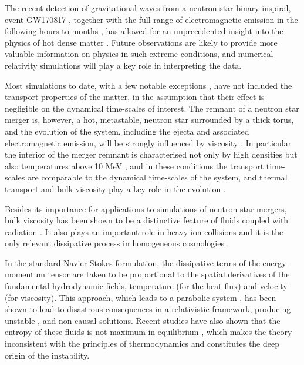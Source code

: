 \documentclass[useAMS,usenatbib,prd,twocolumn,nofootinbib]{revtex4-1}
\begin{document}
The recent detection of gravitational waves from a neutron star binary inspiral, event GW170817 \citep{AbbottNS1}, together with the full range of electromagnetic emission in the following hours to months \citep{AbbottNS2}, has allowed for an unprecedented insight into the physics of hot dense matter \citep{AbbottNS3}. Future observations are likely to provide more valuable information on physics in such extreme conditions, and numerical relativity simulations will play a key role in interpreting the data.


Most simulations to date, with a few notable exceptions \citep{Duez04, SK17, SK172, Radice17}, have not included the transport properties of the matter, in the assumption that their effect is negligible on the dynamical time-scales of interest. The remnant of a neutron star merger is, however, a hot, metastable, neutron star surrounded by a thick torus, and the evolution of the system, including the ejecta and associated electromagnetic emission, will be strongly influenced by viscosity \citep{RadiceEjecta, RadiceEjecta2}. In particular the interior of the merger remnant is characterised not only by high densities but also temperatures above 10 MeV \citep{Perego19}, and in these conditions the transport time-scales are comparable to the dynamical time-scales of the system, and thermal transport and bulk viscosity play a key role in the evolution \citep{AlfordRezzolla}.

Besides its importance for applications to simulations of neutron star mergers, bulk viscosity has been shown to be a distinctive feature of fluids coupled with radiation \citep{UdeyIsrael1982,gavassino2020radiation}. It also plays an important role in heavy ion collisions \citep{FlorkowskiReview2018} and it is the only relevant dissipative process in homogeneous cosmologies \citep{Maartens1995}.



In the standard Navier-Stokes formulation, the dissipative terms of the energy-momentum tensor are taken to be proportional to the spatial derivatives of the fundamental hydrodynamic fields, temperature (for the heat flux) and velocity (for viscosity). This approach, which leads to a parabolic system \citep{Geroch95}, has been shown to lead to disastrous consequences in a relativistic framework, producing unstable \citep{Hiscock_Insatibility_first_order}, and non-causal solutions. Recent studies have also shown that the entropy of these fluids is not maximum in equilibrium \citep{GavassinoLyapunov2020}, which makes the theory inconsistent with the principles of thermodynamics and constitutes the deep origin of the instability. 
\end{document}
